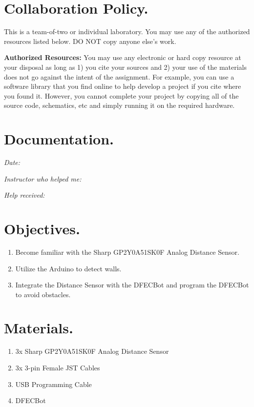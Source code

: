 \documentclass{handout}
\begin{document}
	\maketitle
	
	\section{Collaboration Policy.}
	This is a team-of-two or individual laboratory. You may use any of the authorized resources listed below. DO NOT copy anyone else’s work.
	
	\textbf{Authorized Resources:} You may use any electronic or hard copy resource at your disposal as long as 1) you cite your sources and 2) your use of the materials does not go against the intent of the assignment. For example, you can use a software library that you find online to help develop a project if you cite where you found it. However, you cannot complete your project by copying all of the source code, schematics, etc and simply running it on the required hardware.
	
	\section{Documentation.}
	\textit{Date:}
	
	\textit{Instructor who helped me:}
	
	\textit{Help received:}
	
	\section{Objectives.} 
	\begin{enumerate}
		\item Become familiar with the Sharp GP2Y0A51SK0F Analog Distance Sensor.
		\item Utilize the Arduino to detect walls.
		\item Integrate the Distance Sensor with the DFECBot and program the DFECBot to avoid obstacles.
	\end{enumerate}
	
	\section{Materials.}
	\begin{enumerate}
		\item 3x Sharp GP2Y0A51SK0F Analog Distance Sensor
		\item 3x 3-pin Female JST Cables
		\item USB Programming Cable
		\item DFECBot
	\end{enumerate}
	
\end{document}
